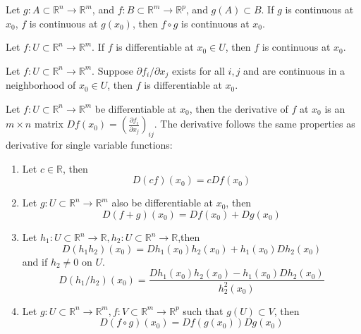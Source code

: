 \documentclass[openany]{book}
\newcommand{\R}{\mathbb{R}}
\begin{document}
\begin{prop}
    Let $g: A\subset\R^n\to\R^m$, and $f: B\subset\R^m\to\R^p$, and $g(A)\subset B$. If $g$ is continuous at $x_0$, $f$ is continuous at $g(x_0)$, then $f\circ g$ is continuous at $x_0$.
\end{prop}

\begin{prop}
    Let $f:U\subset\R^n\to\R^m$. If $f$ is differentiable at $x_0\in U$, then $f$ is continuous at $x_0$.
\end{prop}

\begin{prop}[differentiability]
    Let $f:U\subset\R^n\to\R^m$. Suppose $\partial f_i/\partial x_j$ exists for all $i,j$ and are continuous in a neighborhood of $x_0\in U$, then $f$ is differentiable at $x_0$.
\end{prop}



\begin{prop}
    Let $f:U\subset\R^n\to\R^m$ be differentiable at $x_0$, then the derivative of $f$ at $x_0$ is an $m\times n$ matrix $Df(x_0)=\left(\frac{\partial f_i}{\partial x_j}\right)_{ij}$. The derivative follows the same properties as derivative for single variable functions:
    \begin{enumerate}
        \item Let $c\in\R$, then 
        \begin{equation*}
            D(cf)(x_0)=cDf(x_0) \tag {multiplication of a matrix by constant $c$}
        \end{equation*}
        \item Let $g: U\subset\R^n\to\R^m$ also be differentiable at $x_0$, then 
        \begin{equation*}
            D(f+g)(x_0)=Df(x_0)+Dg(x_0) \tag{sum of two matrices}
        \end{equation*}
        \item Let $h_1: U\subset\R^n\to\R, h_2: U\subset\R^n\to\R$,then 
        \begin{equation*}
            D(h_1h_2)(x_0)=Dh_1(x_0)h_2(x_0)+h_1(x_0)Dh_2(x_0) \tag{product rule}
        \end{equation*}
        and if $h_2\neq 0$ on $U$.
        \begin{equation*}
            D(h_1/h_2)(x_0)=\frac{Dh_1(x_0)h_2(x_0)-h_1(x_0)Dh_2(x_0)}{h_2^2(x_0)} \tag{quotient rule}
        \end{equation*}
        \item Let $g: U\subset\R^n\to\R^m, f:V\subset\R^m\to\R^p$ such that $g(U)\subset V$, then 
        \begin{equation*}
            D(f\circ g)(x_0)=Df(g(x_0))Dg(x_0) \tag{chain rule}
        \end{equation*}
    \end{enumerate}
\end{prop}
\end{document}
